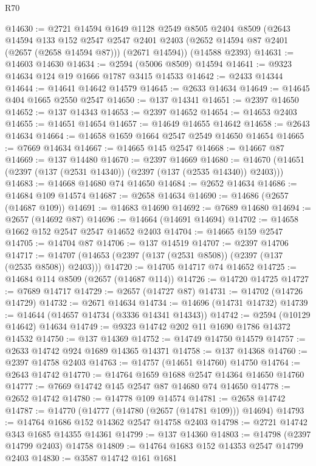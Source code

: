 \begin{lexlean}{R70}
\begin{coremodule}
@14630 := @2721
    @14594
    @1649
    @1128
    @2549
    @8505
    @2404
    @8509
    (@2643
      @14594
      @133
      @152
      @2547
      @2547
      @2401
      @2403
      (@2652 @14594 @87 @2401 (@2657 (@2658 @14594 @87)))
      (@2671 @14594))
    (@14588 @2393)
@14631 := @14603 @14630
@14634 := @2594 (@5006 @8509) @14594
@14641 := @9323 @14634 @124 @19 @1666 @1787 @3415 @14533
@14642 := @2433 @14344
@14644 := @14641 @14642 @14579
@14645 := @2633 @14634
@14649 := @14645 @404 @1665 @2550 @2547
@14650 := @137 @14341
@14651 := @2397 @14650
@14652 := @137 @14343
@14653 := @2397 @14652
@14654 := @14653 @2403
@14655 := @14651 @14654
@14657 := @14649 @14655 @14642
@14658 := @2643 @14634
@14664 := @14658 @1659 @1664 @2547 @2549 @14650 @14654
@14665 := @7669 @14634
@14667 := @14665 @145 @2547
@14668 := @14667 @87
@14669 := @137 @14480
@14670 := @2397 @14669
@14680 := @14670 (@14651 (@2397 (@137 (@2531 @14340)) (@2397 (@137 (@2535 @14340)) @2403)))
@14683 := @14668 @14680 @74 @14650
@14684 := @2652 @14634
@14686 := @14684 @109 @14574
@14687 := @2658 @14634
@14690 := @14686 (@2657 (@14687 @109))
@14691 := @14683 @14690
@14692 := @7689 @14680
@14694 := @2657 (@14692 @87)
@14696 := @14664 (@14691 @14694)
@14702 := @14658 @1662 @152 @2547 @2547 @14652 @2403
@14704 := @14665 @159 @2547
@14705 := @14704 @87
@14706 := @137 @14519
@14707 := @2397 @14706
@14717 := @14707 (@14653 (@2397 (@137 (@2531 @8508)) (@2397 (@137 (@2535 @8508)) @2403)))
@14720 := @14705 @14717 @74 @14652
@14725 := @14684 @114 @8509 (@2657 (@14687 @114))
@14726 := @14720 @14725
@14727 := @7689 @14717
@14729 := @2657 (@14727 @87)
@14731 := @14702 (@14726 @14729)
@14732 := @2671 @14634
@14734 := @14696 (@14731 @14732)
@14739 := @14644 (@14657 @14734 (@3336 @14341 @14343))
@14742 := @2594 (@10129 @14642) @14634
@14749 := @9323 @14742 @202 @11 @1690 @1786 @14372 @14532
@14750 := @137 @14369
@14752 := @14749 @14750 @14579
@14757 := @2633 @14742 @924 @1689 @14365 @14371
@14758 := @137 @14368
@14760 := @2397 @14758 @2403
@14763 := @14757 (@14651 @14760) @14750
@14764 := @2643 @14742
@14770 := @14764 @1659 @1688 @2547 @14364 @14650 @14760
@14777 := @7669 @14742 @145 @2547 @87 @14680 @74 @14650
@14778 := @2652 @14742
@14780 := @14778 @109 @14574
@14781 := @2658 @14742
@14787 := @14770 (@14777 (@14780 (@2657 (@14781 @109))) @14694)
@14793 := @14764 @1686 @152 @14362 @2547 @14758 @2403
@14798 := @2721 @14742 @343 @1685 @14355 @14361
@14799 := @137 @14360
@14803 := @14798 (@2397 @14799 @2403) @14758
@14809 := @14764 @1683 @152 @14353 @2547 @14799 @2403
@14830 := @3587
    @14742
    @161
    @1681

\end{coremodule}
\end{lexlean}
